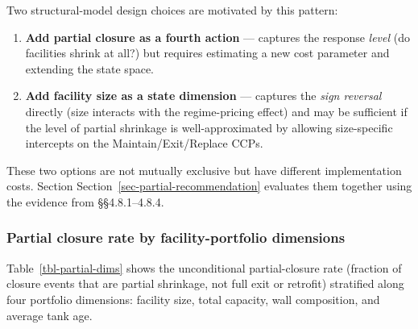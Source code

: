 \documentclass[
  11pt,
]{article}
\providecommand{\tightlist}{%
  \setlength{\itemsep}{0pt}\setlength{\parskip}{0pt}}\usepackage{longtable,booktabs,array}
\begin{document}
Two structural-model design choices are motivated by this pattern:

\begin{enumerate}
\def\labelenumi{\arabic{enumi}.}
\tightlist
\item
  \textbf{Add partial closure as a fourth action} --- captures the
  response \emph{level} (do facilities shrink at all?) but requires
  estimating a new cost parameter and extending the state space.
\item
  \textbf{Add facility size as a state dimension} --- captures the
  \emph{sign reversal} directly (size interacts with the regime-pricing
  effect) and may be sufficient if the level of partial shrinkage is
  well-approximated by allowing size-specific intercepts on the
  Maintain/Exit/Replace CCPs.
\end{enumerate}

These two options are not mutually exclusive but have different
implementation costs. Section Section~\ref{sec-partial-recommendation}
evaluates them together using the evidence from §§4.8.1--4.8.4.

\subsubsection{Partial closure rate by facility-portfolio
dimensions}\label{sec-partial-dims}

Table~\ref{tbl-partial-dims} shows the unconditional partial-closure
rate (fraction of closure events that are partial shrinkage, not full
exit or retrofit) stratified along four portfolio dimensions: facility
size, total capacity, wall composition, and average tank age.
\end{document}
